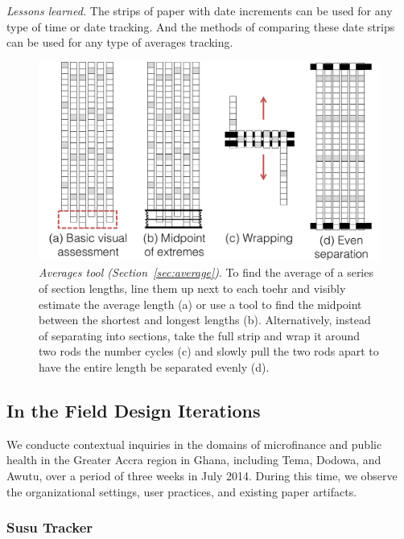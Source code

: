 \documentclass{sig-alternate}
\begin{document}
\emph{Lessons learned.}
The strips of paper with date increments can be used for any type of time or date tracking. And the methods of comparing these date strips can be used for any type of averages tracking. 

\begin{figure}
\centering
\includegraphics[width=\linewidth]{img/average.png}
\caption{\emph{Averages tool (Section~\ref{sec:average})}. To find the average of a series of section lengths, line them up next to each toehr and visibly estimate the average length (a) or use a tool to find the midpoint between the shortest and longest lengths (b). Alternatively, instead of separating into sections, take the full strip and wrap it around two rods the number cycles (c) and slowly pull the two rods apart to have the entire length be separated evenly (d).}
\label{fig:average}
\end{figure}

\subsection{In the Field Design Iterations}
\label{sec:field}

We conducte contextual inquiries in the domains of microfinance and public health in the Greater Accra region in Ghana, including Tema, Dodowa, and Awutu, over a period of three weeks in July 2014. During this time, we observe the organizational settings, user practices, and existing paper artifacts. 

\subsubsection{Susu Tracker}
\label{sec:susu}
\end{document}
